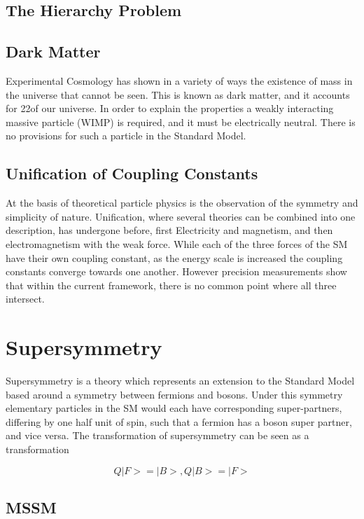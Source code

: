 \begin{description}
\subsection{The Hierarchy Problem}
\subsection{Dark Matter}

Experimental Cosmology has shown in a variety of ways the existence of mass in the universe that cannot be seen. This is known as dark matter, and it accounts for 22\pc of our universe. In order to explain the properties a weakly interacting massive particle (WIMP) is required, and it must be electrically neutral. There is no provisions for such a particle in the Standard Model. 

\subsection{Unification of Coupling Constants}

At the basis of theoretical particle physics is the observation of the symmetry and simplicity of nature. Unification, where several theories can be combined into one description,  has undergone before, first Electricity and magnetism, and then electromagnetism with the weak force. While each of the three forces of the SM have their own coupling constant, as the energy scale is increased the coupling constants converge towards one another. However precision measurements show that within the current framework,  there is no common point where all three intersect.


\section{Supersymmetry}
Supersymmetry is a theory which represents an extension to the Standard Model based around a symmetry between fermions and bosons. Under this symmetry elementary particles in the SM would each have corresponding super-partners, differing by one half unit of spin, such that a fermion has a boson super partner, and vice versa. The transformation of supersymmetry can be seen as a transformation 

\begin{equation}
Q|F> = |B>, 	Q|B> = |F> 
\label{eqn:Q}
\end{equation}




\subsection{MSSM} 


\end{description}
